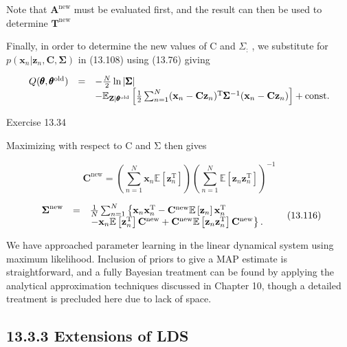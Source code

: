 \documentclass[
  10
]{article}
\begin{document}
Note that \(\mathbf { A } ^ { \mathrm { n e w } }\) must be evaluated
first, and the result can then be used to determine
\(\mathbf { T } ^ { \mathrm { n e w } }\)

Finally, in order to determine the new values of C and
\(\Sigma _ { : }\) , we substitute for
\(p ( \mathbf { x } _ { n } | \mathbf { z } _ { n } , \mathbf { C } , \pmb { \Sigma } )\)
in (13.108) using (13.76) giving

\[
\begin{array}{r c l} Q (\pmb {\theta}, \pmb {\theta} ^ {\mathrm{old}}) & = & - \frac {N}{2} \ln | \pmb {\Sigma} | \\ & & - \mathbb {E} _ {\mathbf {Z} | \pmb {\theta} ^ {\mathrm{old}}} \left[ \frac {1}{2} \sum_ {n = 1} ^ {N} (\mathbf {x} _ {n} - \mathbf {C z} _ {n}) ^ {\mathrm{T}} \pmb {\Sigma} ^ {- 1} (\mathbf {x} _ {n} - \mathbf {C z} _ {n}) \right] + \mathrm{const.} \end{array}
\]

Exercise 13.34

Maximizing with respect to C and Σ then gives

\[
\mathbf {C} ^ {\mathrm{new}} = \left(\sum_ {n = 1} ^ {N} \mathbf {x} _ {n} \mathbb {E} \left[ \mathbf {z} _ {n} ^ {\mathrm{T}} \right]\right) \left(\sum_ {n = 1} ^ {N} \mathbb {E} \left[ \mathbf {z} _ {n} \mathbf {z} _ {n} ^ {\mathrm{T}} \right]\right) ^ {- 1}\tag{13.115}
\]

\[
\begin{array}{r c l} \boldsymbol {\Sigma} ^ {\mathrm{new}} & = & \frac {1}{N} \sum_ {n = 1} ^ {N} \left\{\mathbf {x} _ {n} \mathbf {x} _ {n} ^ {\mathrm{T}} - \mathbf {C} ^ {\mathrm{new}} \mathbb {E} \left[ \mathbf {z} _ {n} \right] \mathbf {x} _ {n} ^ {\mathrm{T}} \right. \\ & & \left. - \mathbf {x} _ {n} \mathbb {E} \left[ \mathbf {z} _ {n} ^ {\mathrm{T}} \right] \mathbf {C} ^ {\mathrm{new}} + \mathbf {C} ^ {\mathrm{new}} \mathbb {E} \left[ \mathbf {z} _ {n} \mathbf {z} _ {n} ^ {\mathrm{T}} \right] \mathbf {C} ^ {\mathrm{new}} \right\}. \end{array}\tag{13.116}
\]

We have approached parameter learning in the linear dynamical system
using maximum likelihood. Inclusion of priors to give a MAP estimate is
straightforward, and a fully Bayesian treatment can be found by applying
the analytical approximation techniques discussed in Chapter 10, though
a detailed treatment is precluded here due to lack of space.

\subsection{13.3.3 Extensions of LDS}\label{extensions-of-lds}
\end{document}
